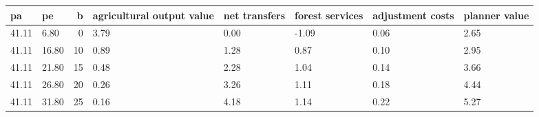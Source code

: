 \begin{tabular}{llrlllll}
\toprule
pa & pe & b & agricultural output value & net transfers & forest services & adjustment costs & planner value \\
\midrule
41.11 & 6.80 & 0 & 3.79 & 0.00 & -1.09 & 0.06 & 2.65 \\
41.11 & 16.80 & 10 & 0.89 & 1.28 & 0.87 & 0.10 & 2.95 \\
41.11 & 21.80 & 15 & 0.48 & 2.28 & 1.04 & 0.14 & 3.66 \\
41.11 & 26.80 & 20 & 0.26 & 3.26 & 1.11 & 0.18 & 4.44 \\
41.11 & 31.80 & 25 & 0.16 & 4.18 & 1.14 & 0.22 & 5.27 \\
\bottomrule
\end{tabular}
